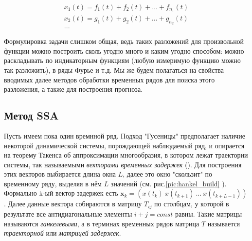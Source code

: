 	    	\begin{gather*}
	    		x_1(t) = f_1(t) + f_2(t) + \ldots + f_{n_1}(t) \\
	    		x_2(t) = g_1(t) + g_2(t) + \ldots + g_{n_2}(t) \\
	    			   ...
	    	\end{gather*}
	    	
	    	Формулировка задачи слишком общая, ведь таких разложений для произвольной функции можно построить сколь угодно много и каким угодно способом: можно раскладывать по индикаторным функциям (любую измеримую функцию можно так разложить), в ряды Фурье и т.д. Мы же будем полагаться на свойства вводимых далее методов обработки временных рядов для поиска этого разложения, а также для построения прогноза.
	    
	    	\subsection*{Метод SSA}
	    	
	    	Пусть имеем пока один времнной ряд. Подход "Гусеницы" предполагает наличие некоторой динамической системы, порождающей наблюдаемый ряд, и опирается на теорему Такенса об аппроксимации многообразия, в котором лежат траектории системы, так называемыми \textit{векторами временных задержек} (\cite{citeulike:2735031}). Для построения этих векторов выбирается длина окна $ L $, далее это окно "скользит" по временному ряду, выделяя в нём $ L $ значений (см. рис.\ref{pic:hankel_build} ). Формально k-ый вектор задержек есть $ \mathbf{x}_k = ( x(t_k) \  x(t_{k+1}) \  \ldots \  x(t_{k + L - 1}) ) $. Далее данные вектора собираются в матрицу $ T_{ij} $ по столбцам, у которой в результате все антидиагональные элементы $ i + j = const $ равны. Такие матрицы называются \textit{ганкелевыми}, а в терминах временных рядов матрица $ T $ называется \textit{траекторной} или \textit{матрицей задержек}.
	    	
